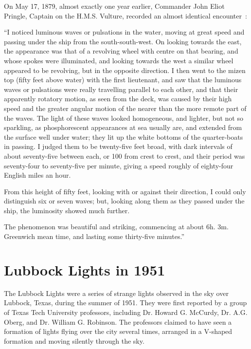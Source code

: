 On May 17, 1879, almost exactly one year earlier,
Commander John Eliot Pringle, Captain on the H.M.S. Vulture,  recorded an almost identical encounter~\cite{Pringle1879}:
\begin{svgraybox}
``I noticed luminous waves or pulsations in the water, moving at great speed and passing under the ship from the south-south-west. On looking towards the east, the appearance was that of a revolving wheel with centre on that bearing, and whose spokes were illuminated, and looking towards the west a similar wheel appeared to be revolving, but in the opposite direction. I then went to the mizen top (fifty feet above water) with the first lieutenant, and saw that the luminous waves or pulsations were really travelling parallel to each other, and that their apparently rotatory motion, as seen from the deck, was caused by their high speed and the greater angular motion of the nearer than the more remote part of the waves. The light of these waves looked homogeneous, and lighter, but not so sparkling, as phosphorescent appearances at sea usually are, and extended from the surface well under water; they lit up the white bottoms of the quarter-boats in passing. I judged them to be twenty-five feet broad, with dark intervals of about seventy-five between each, or 100 from crest to crest, and their period was seventy-four to seventy-five per minute, giving a speed roughly of eighty-four English miles an hour.

From this height of fifty feet, looking with or against their direction, I could only distinguish six or seven waves; but, looking along them as they passed under the ship, the luminosity showed much further.

The phenomenon was beautiful and striking, commencing at about 6h. 3m. Greenwich mean time, and lasting some thirty-five minutes.''
\end{svgraybox}


\section{Lubbock Lights in 1951}

\label{2023-UFO-part-History-chapter-post-1945-pre-1953.tex-ll1951}
The Lubbock Lights were a series of strange lights observed in the sky over Lubbock, Texas, during the summer of 1951. They were first reported by a group of Texas Tech University professors, including Dr. Howard G. McCurdy, Dr. A.G. Oberg, and Dr. William G. Robinson. The professors claimed to have seen a formation of lights flying over the city several times, arranged in a V-shaped formation and moving silently through the sky.

